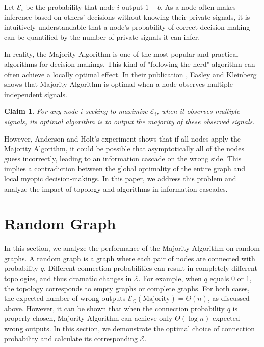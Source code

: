 \documentclass[a4paper,UKenglish]{lipics}
\newtheorem{clm}[thm]{Claim}
\theoremstyle{definition}
\begin{document}
Let $\mathcal{E}_i$ be the probability that node $i$ output $1 - b$. 
As a node often makes inference based on others' decisions without knowing their private signals, 
	it is intuitively understandable that a node's probability of correct decision-making can be quantified by the number of private signals it can infer.

In reality, the Majority Algorithm is one of the most popular and practical algorithms for decision-makings. 
This kind of "following the herd" algorithm can often achieve a locally optimal effect. 
In their publication \cite{easley2010networks}, Easley and Kleinberg shows that Majority Algorithm is optimal when a node observes multiple independent signals.
\begin{clm}
	\label{clm:multiple is optimal}
	For any node $i$ seeking to maximize $\mathcal{E}_i$, 
		when it observes multiple signals, its optimal algorithm is to output the majority of these observed signals.
\end{clm}

However, Anderson and Holt's experiment shows that if all nodes apply the Majority Algorithm, 
	it could be possible that asymptotically all of the nodes guess incorrectly, 
	leading to an information cascade on the wrong side. 
This implies a contradiction between the global optimality of the entire graph and local myopic decision-makings.
In this paper, we address this problem and analyze the impact of topology and algorithms in information cascades.









\section{Random Graph}
In this section, we analyze the performance of the Majority Algorithm on random graphs.
A random graph is a graph where each pair of nodes are connected with probability $q$.
Different connection probabilities can result in completely different topologies, and thus dramatic changes in $\mathcal{E}$.
For example, when $q$ equals 0 or 1, the topology corresponds to empty graphs or complete graphs.
For both cases, the expected number of wrong outputs $\mathcal{E}_G(\text{Majority}) = \Theta(n)$, as discussed above.
However, it can be shown that when the connection probability $q$ is properly chosen, 
	Majority Algorithm can achieve only $\Theta(\log n)$ expected wrong outputs.
In this section, we demonstrate the optimal choice of connection probability
	and calculate its corresponding $\mathcal{E}$.
	
\end{document}
